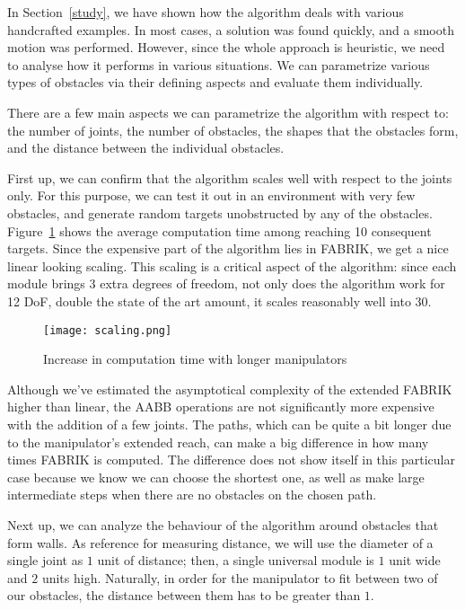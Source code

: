 In Section~\ref{study}, we have shown how the algorithm deals with various handcrafted examples. In most cases, a solution was found quickly, and a smooth motion was performed. However, since the whole approach is heuristic, we need to analyse how it performs in various situations. We can parametrize various types of obstacles via their defining aspects and evaluate them individually.

There are a few main aspects we can parametrize the algorithm with respect to: the number of joints, the number of obstacles, the shapes that the obstacles form, and the distance between the individual obstacles.

First up, we can confirm that the algorithm scales well with respect to the joints only. For this purpose, we can test it out in an environment with very few obstacles, and generate random targets unobstructed by any of the obstacles. Figure~\ref{fig:scaling} shows the average computation time among reaching 10 consequent targets. Since the expensive part of the algorithm lies in FABRIK, we get a nice linear looking scaling. This scaling is a critical aspect of the algorithm: since each module brings 3 extra degrees of freedom, not only does the algorithm work for 12 DoF, double the state of the art amount, it scales reasonably well into 30.

\begin{figure}
  \centering
  \texttt{[image: scaling.png]}
  \caption{Increase in computation time with longer manipulators}\label{fig:scaling}
\end{figure}

Although we've estimated the asymptotical complexity of the extended FABRIK higher than linear, the AABB operations are not significantly more expensive with the addition of a few joints.
The paths, which can be quite a bit longer due to the manipulator's extended reach, can make a big difference in how many times FABRIK is computed. The difference does not show itself in this particular case because we know we can choose the shortest one, as well as make large intermediate steps when there are no obstacles on the chosen path.

Next up, we can analyze the behaviour of the algorithm around obstacles that form walls. As reference for measuring distance, we will use the diameter of a single joint as $1$ unit of distance; then, a single universal module is $1$ unit wide and $2$ units high. Naturally, in order for the manipulator to fit between two of our obstacles, the distance between them has to be greater than $1$.

